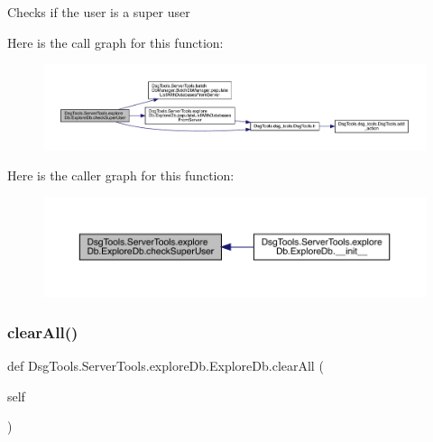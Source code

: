 \begin{DoxyVerb}Checks if the user is a super user
\end{DoxyVerb}
 Here is the call graph for this function\+:
\nopagebreak
\begin{figure}[H]
\begin{center}
\leavevmode
\includegraphics[width=350pt]{class_dsg_tools_1_1_server_tools_1_1explore_db_1_1_explore_db_ae81421cf0a3d7dff4905f2c14001643a_cgraph}
\end{center}
\end{figure}
Here is the caller graph for this function\+:
\nopagebreak
\begin{figure}[H]
\begin{center}
\leavevmode
\includegraphics[width=350pt]{class_dsg_tools_1_1_server_tools_1_1explore_db_1_1_explore_db_ae81421cf0a3d7dff4905f2c14001643a_icgraph}
\end{center}
\end{figure}
\mbox{\label{class_dsg_tools_1_1_server_tools_1_1explore_db_1_1_explore_db_a206527b9629e7cf40d355230e959b4ee}} 
\subsubsection{\texorpdfstring{clear\+All()}{clearAll()}}
{\footnotesize\ttfamily def Dsg\+Tools.\+Server\+Tools.\+explore\+Db.\+Explore\+Db.\+clear\+All (\begin{DoxyParamCaption}\item[{}]{self }\end{DoxyParamCaption})}

